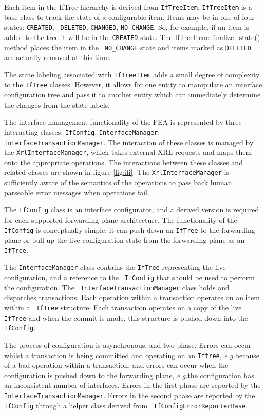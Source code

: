 \documentclass[11pt]{article}
\newcommand{\eg}{\emph{e.g.\/}} %
\begin{document}
Each item in the IfTree hierarchy is derived from {\tt IfTreeItem}.
{\tt IfTreeItem} is a base class to track the state of a configurable
item. Items may be in one of four states: {\tt CREATED}, {\tt
DELETED}, {\tt CHANGED}, {\tt NO\_CHANGE}.  So, for example, if an
item is added to the tree it will be in the {\tt CREATED} state.  The
{IfTreeItem::finalize\_state()} method places the item in the {\tt
NO\_CHANGE} state and items marked as {\tt DELETED} are actually
removed at this time.  

The state labeling associated with {\tt IfTreeItem} adds a small
degree of complexity to the {\tt IfTree} classes. However, it allows
for one entity to manipulate an interface configuration tree and pass
it to another entity which can immediately determine the changes from
the state labels.

The interface management functionality of the FEA is represented by
three interacting classes: {\tt IfConfig}, {\tt InterfaceManager},
{\tt InterfaceTransactionManager}.  The interaction of these classes
is managed by the {\tt XrlInterfaceManager}, which takes external XRL
requests and maps them onto the appropriate operations.  The
interactions between these classes and related classes are shown in
figure \ref{fig:ifi}. The {\tt XrlInterfaceManager} is sufficiently
aware of the semantics of the operations to pass back human parseable
error messages when operations fail.

The {\tt IfConfig} class is an interface configurator, and a derived
version is required for each supported forwarding plane architecture.
The functionality of the {\tt IfConfig} is conceptually simple: it can
push-down an {\tt IfTree} to the forwarding plane or pull-up the live
configuration state from the forwarding plane as an {\tt IfTree}.

The {\tt InterfaceManager} class contains the {\tt IfTree}
representing the live configuration, and a reference to the {\tt
IfConfig} that should be used to perform the configuration.  The {\tt
InterfaceTransactionManager} class holds and dispatches transactions.
Each operation within a transaction operates on an item within a {\tt
IfTree} structure.  Each transaction operates on a copy of the live
{\tt IfTree} and when the commit is made, this structure is pushed
down into the {\tt IfConfig}.

The process of configuration is asynchronous, and two phase.  Errors
can occur whilst a transaction is being committed and operating on an
{\tt Iftree}, \eg because of a bad operation within a transaction, and
errors can occur when the configuration is pushed down to the
forwarding plane, \eg the configuration has an inconsistent number of
interfaces.  Errors in the first phase are reported by the {\tt
InterfaceTransactionManager}.  Errors in the second phase are reported
by the {\tt IfConfig} through a helper class derived from {\tt
IfConfigErrorReporterBase}.
\end{document}
